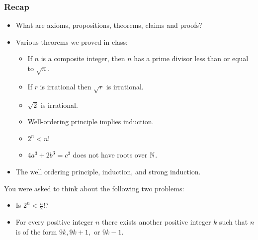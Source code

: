  \begin{frame}[fragile]
\frametitle{Recap}
\begin{itemize}
\item What are axioms, propositions, theorems, claims and proofs?
\item Various theorems we proved in class:


\begin{itemize}
\item If $n$ is a composite integer, then $n$ has a prime divisor less than or equal to $\sqrt{n}$.

\item If $r$ is irrational then $\sqrt{r}$ is irrational.

\item $\sqrt{2}$ is irrational.

\item Well-ordering principle implies induction.

\item $2^n < n!$

\item $4a^3+2b^3=c^3$ does not have roots over ${{\mathbb{N}}}$.

\end{itemize}



\item The well ordering principle, induction, and strong induction.
\end{itemize}
You were asked to think about the following two problems:
\begin{itemize}
\item Is $2^n < \frac{n}{2}!$?
\item For every positive integer $n$ there exists another positive integer $k$ such that $n$ is of the form $9k, 9k+1,$ or $9k-1$.
\end{itemize}

\end{frame}

